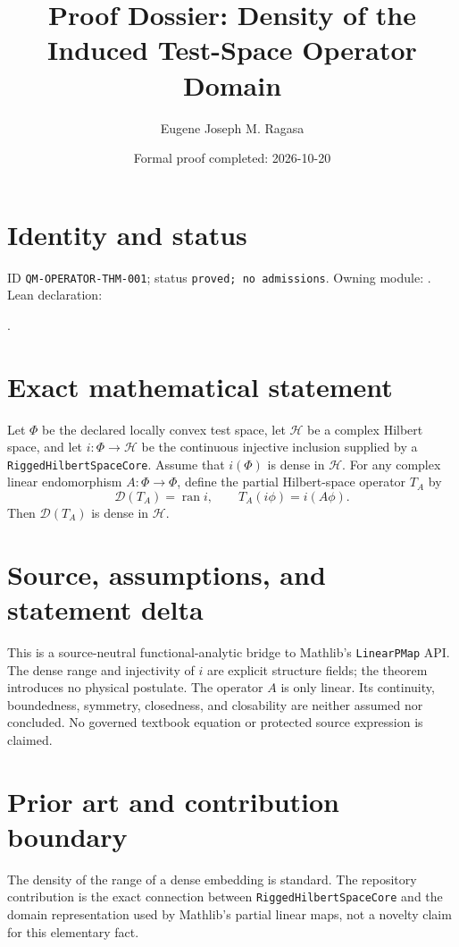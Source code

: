 \documentclass[11pt]{article}
\title{Proof Dossier: Density of the Induced Test-Space Operator Domain}
\author{Eugene Joseph M. Ragasa}
\date{Formal proof completed: 2026-10-20}
\begin{document}
\maketitle

\section{Identity and status}
ID \texttt{QM-OPERATOR-THM-001}; status \texttt{proved; no admissions}.
Owning module: .
Lean declaration:
\par{}.

\section{Exact mathematical statement}
Let $\Phi$ be the declared locally convex test space, let $\mathcal H$ be a complex Hilbert space,
and let $i:\Phi\to\mathcal H$ be the continuous injective inclusion supplied by a
\texttt{RiggedHilbertSpaceCore}. Assume that $i(\Phi)$ is dense in $\mathcal H$. For any complex
linear endomorphism $A:\Phi\to\Phi$, define the partial Hilbert-space operator $T_A$ by
\[
  \mathcal D(T_A)=\operatorname{ran} i,
  \qquad T_A(i\phi)=i(A\phi).
\]
Then $\mathcal D(T_A)$ is dense in $\mathcal H$.

\section{Source, assumptions, and statement delta}
This is a source-neutral functional-analytic bridge to Mathlib's \texttt{LinearPMap} API. The dense
range and injectivity of $i$ are explicit structure fields; the theorem introduces no physical
postulate. The operator $A$ is only linear. Its continuity, boundedness, symmetry, closedness, and
closability are neither assumed nor concluded. No governed textbook equation or protected source
expression is claimed.

\section{Prior art and contribution boundary}
The density of the range of a dense embedding is standard. The repository contribution is the exact
connection between \texttt{RiggedHilbertSpaceCore} and the domain representation used by Mathlib's
partial linear maps, not a novelty claim for this elementary fact.
\end{document}
